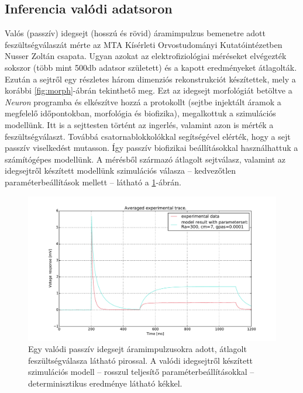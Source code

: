 \FloatBarrier
\clearpage
\subsection{Inferencia valódi adatsoron}
Valós (passzív) idegsejt (hosszú és rövid) áramimpulzus bemenetre adott feszültségválaszát mérte az MTA Kísérleti Orvostudományi Kutatóintézetben Nusser Zoltán csapata. Ugyan azokat az elektrofiziológiai méréseket elvégezték sokszor (több mint 500db adatsor született) és a kapott eredményeket átlagolták. Ezután a sejtről egy részletes három dimenziós rekonstrukciót készítettek, mely a korábbi  \ref{fig:morph}-ábrán tekinthető meg. Ezt az idegsejt morfológiát betöltve a \textit{Neuron} programba és elkészítve hozzá a protokollt (sejtbe injektált áramok a megfelelő időpontokban, morfológia és biofizika), megalkottuk a szimulációs modellünk. Itt is a sejttesten történt az ingerlés, valamint azon is mérték a feszültségválaszt. Továbbá csatornablokkolókkal segítségével elérték, hogy a sejt passzív viselkedést mutasson. Így passzív biofizikai beállításokkal használhattuk a számítógépes modellünk. A mérésből származó átlagolt sejtválasz, valamint az idegsejtről készített modellünk szimulációs válasza -- kedvezőtlen paraméterbeállítások mellett -- látható a \ref{fig:exptrace}-ábrán.

\begin{figure}[h!]
	\centering
	\includegraphics[width=0.9\linewidth]{fig/exp/exptrace.pdf}
	\caption[Valós passzív idegsejt áramimpulzusokra adott feszültségválasza]{Egy valódi passzív idegsejt áramimpulzusokra adott, átlagolt feszültségválasza látható pirossal. A valódi idegsejtről készített szimulációs modell -- rosszul teljesítő paraméterbeállításokkal --  determinisztikus eredménye látható kékkel.}
	\label{fig:exptrace}
\end{figure}

